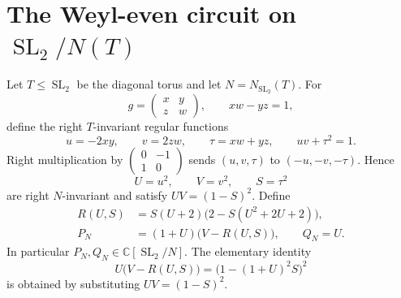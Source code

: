 \documentclass[11pt]{article}
\numberwithin{equation}{section}
\theoremstyle{definition}
\theoremstyle{remark}
\newcommand{\C}{\mathbb C}
\DeclareMathOperator{\SL}{SL}
\begin{document}
\section{The Weyl-even circuit on \texorpdfstring{$\SL_2/N(T)$}{SL2/N(T)}}\label{sec:normalizer}
Let $T\leq\SL_2$ be the diagonal torus and let $N=N_{\SL_2}(T)$. For
\[
 g=\begin{pmatrix}x&y\\z&w\end{pmatrix},\qquad xw-yz=1,
\]
define the right $T$-invariant regular functions
\[
 u=-2xy,\qquad v=2zw,\qquad \tau=xw+yz,
 \qquad uv+\tau^2=1.
\]
Right multiplication by $\left(\begin{smallmatrix}0&-1\\1&0\end{smallmatrix}\right)$ sends $(u,v,\tau)$ to $(-u,-v,-\tau)$. Hence
\[
 U=u^2,\qquad V=v^2,\qquad S=\tau^2
\]
are right $N$-invariant and satisfy $UV=(1-S)^2$. Define
\begin{equation}\label{eq:evenpair}
 \begin{split}
 R(U,S)&=S(U+2)\bigl(2-S(U^2+2U+2)\bigr),\\
 P_N&=(1+U)\bigl(V-R(U,S)\bigr),\qquad Q_N=U.
 \end{split}
\end{equation}
In particular $P_N,Q_N\in\C[\SL_2/N]$. The elementary identity
\begin{equation}\label{eq:evenidentity}
 U\bigl(V-R(U,S)\bigr)=\bigl(1-(1+U)^2S\bigr)^2
\end{equation}
is obtained by substituting $UV=(1-S)^2$.
\end{document}
